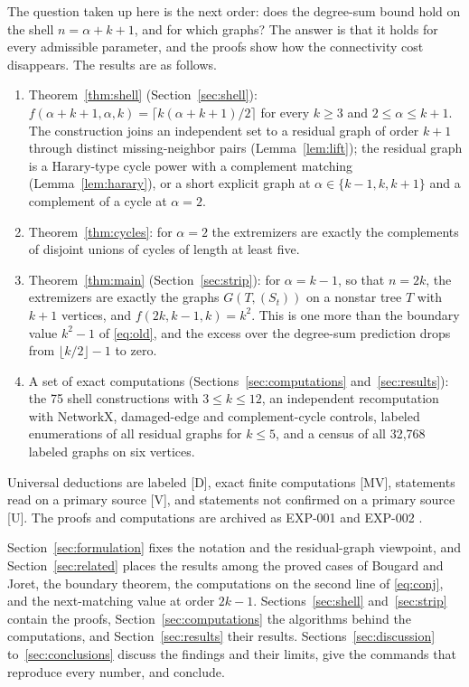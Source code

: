 \documentclass[11pt]{article}
\theoremstyle{remark}
\begin{document}
The question taken up here is the next order: does the degree-sum bound hold on the shell $n=\alpha+k+1$, and for which graphs?
The answer is that it holds for every admissible parameter, and the proofs show how the connectivity cost disappears.
The results are as follows.
\begin{enumerate}
\item Theorem~\ref{thm:shell} (Section~\ref{sec:shell}): $f(\alpha+k+1,\alpha,k)=\lceil k(\alpha+k+1)/2\rceil$ for every $k\ge3$ and $2\le\alpha\le k+1$.
The construction joins an independent set to a residual graph of order $k+1$ through distinct missing-neighbor pairs (Lemma~\ref{lem:lift}); the residual graph is a Harary-type cycle power with a complement matching (Lemma~\ref{lem:harary}), or a short explicit graph at $\alpha\in\{k-1,k,k+1\}$ and a complement of a cycle at $\alpha=2$.
\item Theorem~\ref{thm:cycles}: for $\alpha=2$ the extremizers are exactly the complements of disjoint unions of cycles of length at least five.
\item Theorem~\ref{thm:main} (Section~\ref{sec:strip}): for $\alpha=k-1$, so that $n=2k$, the extremizers are exactly the graphs $G(T,(S_t))$ on a nonstar tree $T$ with $k+1$ vertices, and $f(2k,k-1,k)=k^2$.
This is one more than the boundary value $k^2-1$ of \eqref{eq:old}, and the excess over the degree-sum prediction drops from $\lfloor k/2\rfloor-1$ to zero.
\item A set of exact computations (Sections~\ref{sec:computations} and~\ref{sec:results}): the 75 shell constructions with $3\le k\le12$, an independent recomputation with NetworkX, damaged-edge and complement-cycle controls, labeled enumerations of all residual graphs for $k\le5$, and a census of all 32,768 labeled graphs on six vertices.
\end{enumerate}
Universal deductions are labeled [D], exact finite computations [MV], statements read on a primary source [V], and statements not confirmed on a primary source [U].
The proofs and computations are archived as EXP-001 and EXP-002 \cite{Record,ShellRecord}.

Section~\ref{sec:formulation} fixes the notation and the residual-graph viewpoint, and Section~\ref{sec:related} places the results among the proved cases of Bougard and Joret, the boundary theorem, the computations on the second line of \eqref{eq:conj}, and the next-matching value at order $2k-1$.
Sections~\ref{sec:shell} and~\ref{sec:strip} contain the proofs, Section~\ref{sec:computations} the algorithms behind the computations, and Section~\ref{sec:results} their results.
Sections~\ref{sec:discussion} to~\ref{sec:conclusions} discuss the findings and their limits, give the commands that reproduce every number, and conclude.
\end{document}
